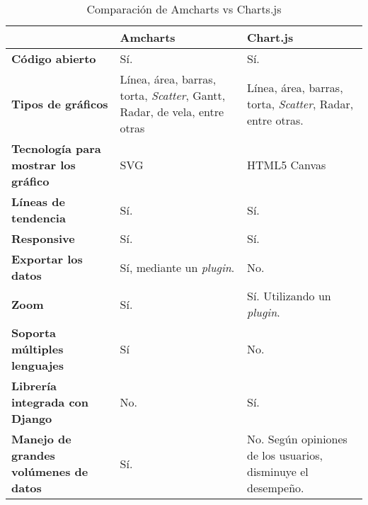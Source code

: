 \begin{table}[h]
\centering
\begin{tabular}{| p{} | p{} | p{} |}
\hline
                                              & \textbf{Amcharts}                                                       & \textbf{Chart.js}                                            \\ \hline
\textbf{Código abierto}                       & Sí.                                                                     & Sí.                                                          \\ \hline
\textbf{Tipos de gráficos}                    & Línea, área, barras, torta, \textit{Scatter}, Gantt, Radar, de vela, entre otras & Línea, área, barras, torta, \textit{Scatter}, Radar, entre otras.     \\ \hline
\textbf{Tecnología para mostrar los gráfico}  & SVG                                                                     & HTML5 Canvas                                                 \\ \hline
\textbf{Líneas de tendencia}                  & Sí.                                                                     & Sí.                                                          \\ \hline
\textbf{Responsive}                           & Sí.                                                                     & Sí.                                                          \\ \hline
\textbf{Exportar los datos}                   & Sí, mediante un \textit{plugin}.                                                 & No.                                                          \\ \hline
\textbf{Zoom}                                 & Sí.                                                                     & Sí. Utilizando un \textit{plugin}.                                    \\ \hline
\textbf{Soporta múltiples lenguajes}          & Sí                                                                      & No.                                                          \\ \hline
\textbf{Librería integrada con Django}        & No.                                                                     & Sí.                                                          \\ \hline
\textbf{Manejo de grandes volúmenes de datos} & Sí.                                                                     & No. Según opiniones de los usuarios, disminuye el desempeño. \\ \hline
\end{tabular}
\caption{Comparación de Amcharts vs Charts.js}
\label{tabla:6.2}
\end{table}
